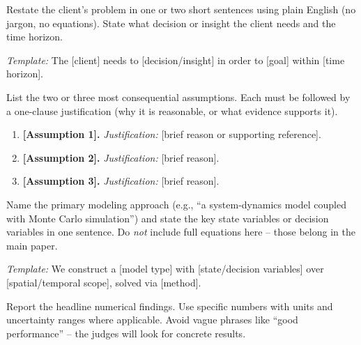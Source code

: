 \begin{description}[leftmargin=0pt, itemindent=0pt, labelsep=0.5em, font=\bfseries]

\item[Problem.]
Restate the client's problem in one or two short sentences using
plain English (no jargon, no equations). State what decision or
insight the client needs and the time horizon.

\textit{Template:} The [client] needs to [decision/insight] in order
to [goal] within [time horizon].

\item[Assumptions.]
List the two or three most consequential assumptions. Each must be
followed by a one-clause justification (why it is reasonable, or
what evidence supports it).

\begin{enumerate}[leftmargin=1.5em, itemsep=0pt]
    \item \textbf{[Assumption 1].} \textit{Justification:} [brief
    reason or supporting reference].
    \item \textbf{[Assumption 2].} \textit{Justification:} [brief
    reason].
    \item \textbf{[Assumption 3].} \textit{Justification:} [brief
    reason].
\end{enumerate}

\item[Model.]
Name the primary modeling approach (e.g., ``a system-dynamics model
coupled with Monte Carlo simulation'') and state the key state
variables or decision variables in one sentence. Do \emph{not} include
full equations here -- those belong in the main paper.

\textit{Template:} We construct a [model type] with [state/decision
variables] over [spatial/temporal scope], solved via [method].

\item[Results.]
Report the headline numerical findings. Use specific numbers with
units and uncertainty ranges where applicable. Avoid vague phrases
like ``good performance'' -- the judges will look for concrete results.


\end{description}
